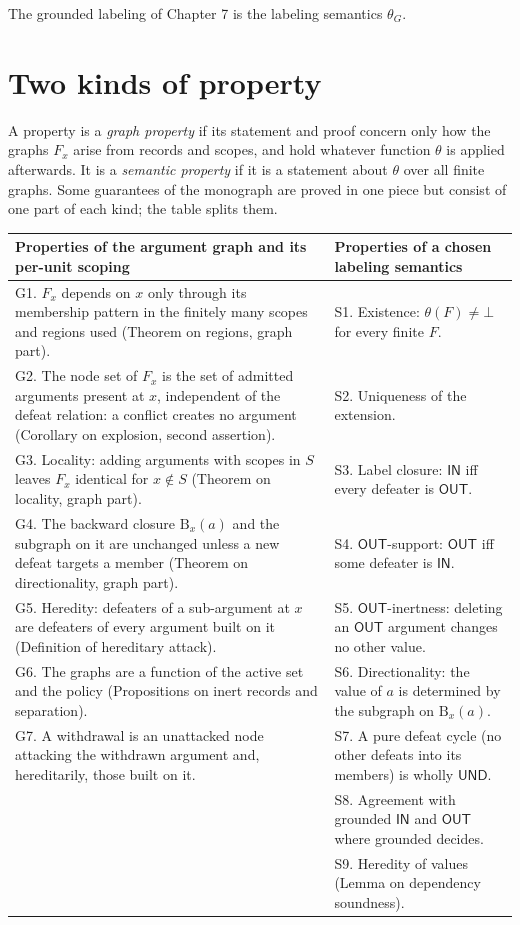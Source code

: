 \documentclass[11pt]{article}
\theoremstyle{plain}
\theoremstyle{definition}
\theoremstyle{remark}
\newcommand{\IN}{\textsf{IN}}
\newcommand{\OUT}{\textsf{OUT}}
\newcommand{\UND}{\textsf{UND}}
\newcommand{\Bc}{\mathrm{B}}
\begin{document}
The grounded labeling of Chapter 7 is the labeling semantics $\theta_G$. 
\section{Two kinds of property}\label{sec:sort}

A property is a \emph{graph property} if its statement and proof concern only how the graphs $F_x$ arise from records and scopes, and hold whatever function $\theta$ is applied afterwards. It is a \emph{semantic property} if it is a statement about $\theta$ over all finite graphs. Some guarantees of the monograph are proved in one piece but consist of one part of each kind; the table splits them.

\begin{center}
\small
\begin{tabularx}{\textwidth}{@{}>{\raggedright\arraybackslash}X >{\raggedright\arraybackslash}X@{}}
\toprule
\textbf{Properties of the argument graph and its per-unit scoping} & \textbf{Properties of a chosen labeling semantics}\\
\midrule
G1. $F_x$ depends on $x$ only through its membership pattern in the finitely many scopes and regions used (Theorem on regions, graph part). & S1. Existence: $\theta(F)\ne\bot$ for every finite $F$.\\[2pt]
G2. The node set of $F_x$ is the set of admitted arguments present at $x$, independent of the defeat relation: a conflict creates no argument (Corollary on explosion, second assertion). & S2. Uniqueness of the extension.\\[2pt]
G3. Locality: adding arguments with scopes in $S$ leaves $F_x$ identical for $x\notin S$ (Theorem on locality, graph part). & S3. Label closure: $\IN$ iff every defeater is $\OUT$.\\[2pt]
G4. The backward closure $\Bc_x(a)$ and the subgraph on it are unchanged unless a new defeat targets a member (Theorem on directionality, graph part). & S4. $\OUT$-support: $\OUT$ iff some defeater is $\IN$.\\[2pt]
G5. Heredity: defeaters of a sub-argument at $x$ are defeaters of every argument built on it (Definition of hereditary attack). & S5. $\OUT$-inertness: deleting an $\OUT$ argument changes no other value.\\[2pt]
G6. The graphs are a function of the active set and the policy (Propositions on inert records and separation). & S6. Directionality: the value of $a$ is determined by the subgraph on $\Bc_x(a)$.\\[2pt]
G7. A withdrawal is an unattacked node attacking the withdrawn argument and, hereditarily, those built on it. & S7. A pure defeat cycle (no other defeats into its members) is wholly $\UND$.\\[2pt]
& S8. Agreement with grounded $\IN$ and $\OUT$ where grounded decides.\\[2pt]
& S9. Heredity of values (Lemma on dependency soundness).\\
\bottomrule
\end{tabularx}
\end{center}
\end{document}
